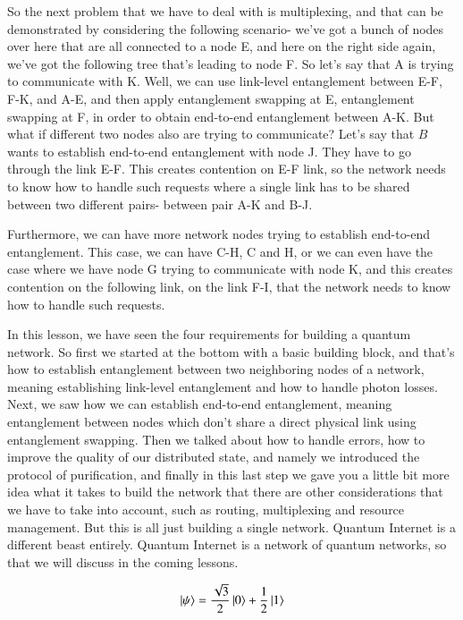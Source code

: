 So the next problem that we have to deal with is multiplexing, and that can be demonstrated by considering the following scenario- we've got a bunch of nodes over here that are all connected to a node E, and here on the right side again, we've got the following tree that's leading to node F. So let's say that A is trying to communicate with K. Well, we can use link-level entanglement between E-F, F-K, and A-E, and then apply entanglement swapping at E, entanglement swapping at F, in order to obtain end-to-end entanglement between A-K. But what if different two nodes also are trying to communicate? Let's say that $B$ wants to establish end-to-end entanglement with node J. They have to go through the link E-F. This creates contention on E-F link, so the network needs to know how to handle such requests where a single link has to be shared between two different pairs- between pair A-K and B-J.

Furthermore, we can have more network nodes trying to establish end-to-end entanglement. This case, we can have C-H, C and H, or we can even have the case where we have node G trying to communicate with node K, and this creates contention on the following link, on the link F-I, that the network needs to know how to handle such requests.

In this lesson, we have seen the four requirements for building a quantum network. So first we started at the bottom with a basic building block, and that's how to establish entanglement between two neighboring nodes of a network, meaning establishing link-level entanglement and how to handle photon losses. Next, we saw how we can establish end-to-end entanglement, meaning entanglement between nodes which don't share a direct physical link using entanglement swapping. Then we talked about how to handle errors, how to improve the quality of our distributed state, and namely we introduced the protocol of purification, and finally in this last step we gave you a little bit more idea what it takes to build the network that there are other considerations that we have to take into account, such as routing, multiplexing and resource management. But this is all just building a single network. Quantum Internet is a different beast entirely. Quantum Internet is a network of quantum networks, so that we will discuss in the coming lessons.


\newpage
\begin{exercises}
\begin{equation*}
\left| \psi \right\rangle = \frac{\sqrt{3}}{2}\left| 0 \right\rangle + \frac{1}{2}\left| 1 \right\rangle
\end{equation*}


\end{exercises}

